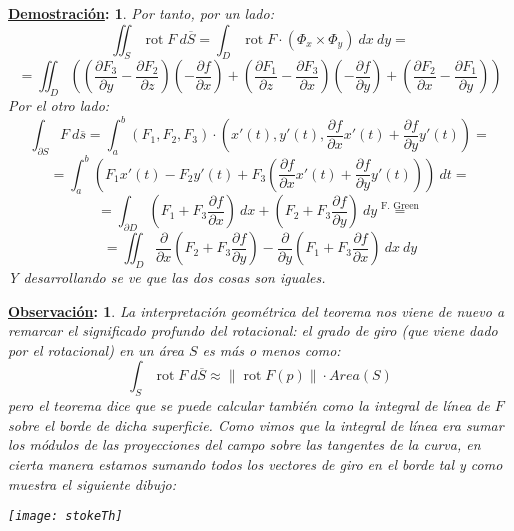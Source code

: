 \documentclass[10pt,a4paper,openright]{book}
\theoremstyle{break}
\newtheorem*{demo}{\underline{Demostración}:}
\newtheorem*{obs}{\underline{Observación}:}
\DeclareMathOperator{\rot}{rot}
\newcommand{\dif}[1]{\ d#1}
\begin{document}
\begin{demo}
Por tanto, por un lado:
$$\iint_{S} \rot F \dif{\overline{S}} = \int_{D} \rot F \cdot \left( \Phi_x \times \Phi_y \right) \dif{x} \dif{y} =$$
$$= \iint_{D} \left( \left( \frac{\partial F_3}{\partial y} - \frac{\partial F_2}{\partial z} \right) \left( -\frac{\partial f}{\partial x} \right) + \left( \frac{\partial F_1}{\partial z} - \frac{\partial F_3}{\partial x} \right) \left( -\frac{\partial f}{\partial y} \right) + \left( \frac{\partial F_2}{\partial x} - \frac{\partial F_1}{\partial y} \right) \right)$$
Por el otro lado: 
$$\int_{\partial S} F \dif{\overline{s}} = \int_{a}^{b} \left( F_1, F_2, F_3 \right) \cdot \left( x'\left( t \right), y'\left( t \right), \frac{\partial f}{\partial x} x'\left( t \right) + \frac{\partial f}{\partial y} y'\left( t \right) \right) = $$
$$= \int_{a}^{b} \left( F_1x'\left( t \right) - F_2y'\left( t \right) + F_3\left( \frac{\partial f}{\partial x} x'\left( t \right) + \frac{\partial f}{\partial y} y'\left( t \right) \right) \right) \dif{t} = $$
$$= \int_{\partial D} \left( F_1 + F_3 \frac{\partial f}{\partial x} \right) \dif{x} + \left( F_2 + F_3 \frac{\partial f}{\partial y} \right) \dif{y} \stackrel{\text{F. Green}}{=}$$
$$= \iint_{D} \frac{\partial}{\partial x} \left( F_2 + F_3 \frac{\partial f}{\partial y} \right) - \frac{\partial}{\partial y} \left( F_1 + F_3 \frac{\partial f}{\partial x} \right) \dif{x} \dif{y}$$
Y desarrollando se ve que las dos cosas son iguales.
\end{demo}
\begin{obs}
La interpretación geométrica del teorema nos viene de nuevo a remarcar el significado profundo del rotacional: el grado de giro (que viene dado por el rotacional) en un área $S$ es más o menos como:
$$\int_{S} \rot F \dif{\overline{S}} \approx \lVert \rot F \left( p \right) \rVert \cdot Area\left( S \right)$$
pero el teorema dice que se puede calcular también como la integral de línea de $F$ sobre el borde de dicha superficie. Como vimos que la integral de línea era sumar los módulos de las proyecciones del campo sobre las tangentes de la curva, en cierta manera estamos sumando todos los vectores de giro en el borde tal y como muestra el siguiente dibujo:
\begin{center}
    \texttt{[image: stokeTh]} 
\end{center}
\end{obs}
\end{document}
